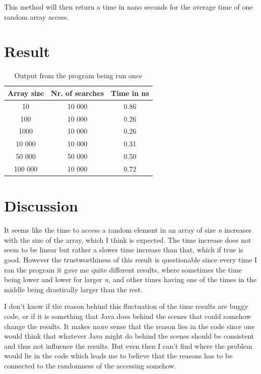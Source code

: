 \documentclass[a4paper,11pt]{article}
\begin{document}
This method will then return a time in nano seconds for the average time of one random array
access.

\section*{Result}

\begin{table}[h]
  \begin{center}
    \begin{tabular}{|c|c|c|}
      \hline
      \textbf{Array size} & \textbf{Nr. of searches} & \textbf{Time in ns} \\
      \hline
      10                  & 10 000                   & 0.86                \\
      100                 & 10 000                   & 0.26                \\
      1000                & 10 000                   & 0.26                \\
      10 000              & 10 000                   & 0.31                \\
      50 000              & 50 000                   & 0.50                \\
      100 000             & 10 000                   & 0.72                \\
      \hline
    \end{tabular}
    \caption{Output from the program being run once}
    \label{tab:task1}
  \end{center}
\end{table}


\section*{Discussion}

It seems like the time to access a random element in an array of
size \textit{n} increases with the size of the array, which I think is expected.
The time increase does not seem to be linear but rather a slower time increase than
that, which if true is good. However the trustworthiness of this result is
questionable since every time I ran the program it gave me quite different results,
where sometimes the time being lower and lower for larger \textit{n}, and other times
having one of the times in the middle being drastically larger than the rest.

I don't know if the reason behind this fluctuation of the time results are buggy code, or
if it is something that Java does behind the scenes that could somehow change the results.
It makes more sense that the reason lies in the code since one would think that whatever
Java might do behind the scenes should be consistent and thus not influence the results.
But even then I can't find where the problem would lie in the code which leads me to believe
that the reasons has to be connected to the randomness of the accessing somehow.
\end{document}
